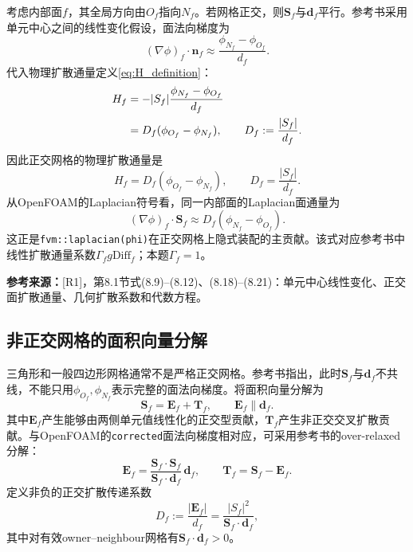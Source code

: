 \documentclass[UTF8,12pt,a4paper]{ctexart}
\numberwithin{equation}{section}
\newcommand{\Rone}{\textnormal{[R1]}}
\newcommand{\source}[1]{%
  \par\smallskip
  \noindent\colorbox{sourcebg}{%
    \parbox{0.955\linewidth}{\footnotesize\color{sourcegray}\textbf{参考来源：}#1}%
  }
  \par\smallskip
}
\begin{document}
考虑内部面$f$，其全局方向由$O_f$指向$N_f$。若网格正交，则$\bm S_f$与$\bm d_f$平行。参考书采用单元中心之间的线性变化假设，面法向梯度为
\begin{equation}
  (\nabla\phi)_f\cdot\bm n_f
  \approx
  \frac{\phi_{N_f}-\phi_{O_f}}{d_f}.
  \label{eq:orth_snGrad}
\end{equation}
代入物理扩散通量定义\eqref{eq:H_definition}：
\begin{align}
  H_f
  &=-|S_f|
  \frac{\phi_{N_f}-\phi_{O_f}}{d_f}
  \notag\\
  &=D_f(\phi_{O_f}-\phi_{N_f}),
  \qquad
  D_f:=\frac{|S_f|}{d_f}.
  \label{eq:orth_H}
\end{align}
因此正交网格的物理扩散通量是
\begin{equation}
  \boxed{
  H_f=D_f(\phi_{O_f}-\phi_{N_f}),
  \qquad
  D_f=\frac{|S_f|}{d_f}.}
  \label{eq:orth_key}
\end{equation}
从OpenFOAM的Laplacian符号看，同一内部面的Laplacian面通量为
\begin{equation}
  (\nabla\phi)_f\cdot\bm S_f
  \approx
  D_f(\phi_{N_f}-\phi_{O_f}).
  \label{eq:orth_lap_flux}
\end{equation}
这正是\texttt{fvm::laplacian(phi)}在正交网格上隐式装配的主贡献。该式对应参考书中线性扩散通量系数$\Gamma_f g\mathrm{Diff}_f$；本题$\Gamma_f=1$。

\source{\Rone，第8.1节式(8.9)--(8.12)、(8.18)--(8.21)：单元中心线性变化、正交面扩散通量、几何扩散系数和代数方程。}

\subsection{非正交网格的面积向量分解}

三角形和一般四边形网格通常不是严格正交网格。参考书指出，此时$\bm S_f$与$\bm d_f$不共线，不能只用$\phi_{O_f},\phi_{N_f}$表示完整的面法向梯度。将面积向量分解为
\begin{equation}
  \boxed{
  \bm S_f=\bm E_f+\bm T_f,
  \qquad
  \bm E_f\parallel\bm d_f.}
  \label{eq:decomposition}
\end{equation}
其中$\bm E_f$产生能够由两侧单元值线性化的正交型贡献，$\bm T_f$产生非正交交叉扩散贡献。与OpenFOAM的\texttt{corrected}面法向梯度相对应，可采用参考书的over-relaxed分解：
\begin{equation}
  \bm E_f
  =\frac{\bm S_f\cdot\bm S_f}
  {\bm S_f\cdot\bm d_f}\,\bm d_f,
  \qquad
  \bm T_f=\bm S_f-\bm E_f.
  \label{eq:over_relaxed}
\end{equation}
定义非负的正交扩散传递系数
\begin{equation}
  D_f:=\frac{|\bm E_f|}{d_f}
  =\frac{|S_f|^2}{\bm S_f\cdot\bm d_f},
  \label{eq:D_nonorth}
\end{equation}
其中对有效owner--neighbour网格有$\bm S_f\cdot\bm d_f>0$。
\end{document}
